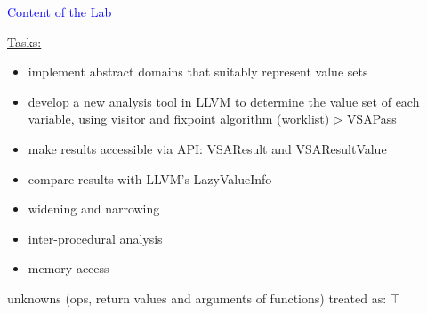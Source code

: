 \begin{frame}[fragile]{\textcolor{blue}{Content of the Lab}}

\underline{Tasks:}
\begin{itemize}
\item implement {\color{blue}abstract domain}s that suitably represent value sets
\item develop a new analysis tool in LLVM to determine the value set of each \\
\qquad variable, using visitor and fixpoint algorithm (worklist) $\triangleright$ {\color{blue} VSAPass}
\item make results accessible via API: {\color{blue} VSAResult} and {\color{blue} VSAResultValue}
\item compare results with LLVM's {\color{blue} LazyValueInfo}
\end{itemize}

\vspace{1cm}

\underline{}
\begin{itemize}
\item widening and narrowing
\item inter-procedural analysis
\item memory access
\end{itemize}
\hfill unknowns (ops, return values and arguments of functions) treated as: {\color{blue} $\top$}

\end{frame}
